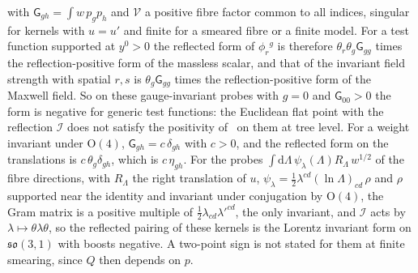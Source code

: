 with \(\mathsf G_{gh}=\int w\,p_gp_h\) and \(\mathcal V\) a positive fibre factor common to all indices, singular for kernels with \(u=u'\) and finite for a smeared fibre or a finite model. For a test function supported at \(y^0>0\) the reflected form of \(\phi_r{}^g\) is therefore \(\theta_r\theta_g\mathsf G_{gg}\) times the reflection-positive form of the massless scalar, and that of the invariant field strength with spatial \(r,s\) is \(\theta_g\mathsf G_{gg}\) times the reflection-positive form of the Maxwell field. So on these gauge-invariant probes with \(g=0\) and \(\mathsf G_{00}>0\) the form is negative for generic test functions: the Euclidean flat point with the reflection \(\mathcal I\) does not satisfy the positivity of~\cite{OsterwalderSchrader1973,OsterwalderSchrader1975} on them at tree level. For a weight invariant under \(\mathrm O(4)\), \(\mathsf G_{gh}=c\,\delta_{gh}\) with \(c>0\), and the reflected form on the translations is \(c\,\theta_g\delta_{gh}\), which is \(c\,\eta_{gh}\). For the probes \(\int\mathrm d\Lambda\,\psi_\lambda(\Lambda)R_\Lambda\,w^{1/2}\) of the fibre directions, with \(R_\Lambda\) the right translation of \(u\), \(\psi_\lambda=\tfrac12\lambda^{cd}(\ln\Lambda)_{cd}\,\rho\) and \(\rho\) supported near the identity and invariant under conjugation by \(\mathrm O(4)\), the Gram matrix is a positive multiple of \(\tfrac12\lambda_{cd}\lambda'^{cd}\), the only invariant, and \(\mathcal I\) acts by \(\lambda\mapsto\theta\lambda\theta\), so the reflected pairing of these kernels is the Lorentz invariant form on \(\mathfrak{so}(3,1)\) with boosts negative. A two-point sign is not stated for them at finite smearing, since \(Q\) then depends on \(p\).


